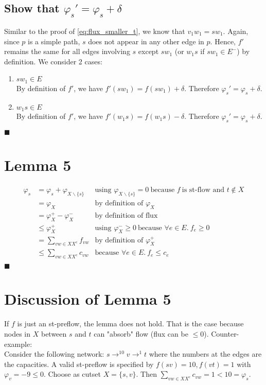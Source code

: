 \documentclass[10pt,a4paper]{article}
\begin{document}
	\subsection*{Show that $\varphi_s' = \varphi_s + \delta$}
	Similar to the proof of \ref{eq:flux_smaller_t}, we know that $v_1w_1 = sw_1$. Again, since $p$ is a simple path, $s$ does not appear in any other edge in $p$. Hence, $f'$ remains the same for all edges involving $s$ except $sw_1$ (or $w_1s$ if $sw_1 \in E^-$) by definition. We consider 2 cases:
	\begin{enumerate}
		\item $sw_1 \in E$ \\
		By definition of $f'$, we have $f'(sw_1) = f(sw_1) + \delta$. Therefore $\varphi_s' = \varphi_s + \delta$.
		\item $w_1s \in E$ \\
		By definition of $f'$, we have $f'(w_1s) = f(w_1s) - \delta$. Therefore $\varphi_s' = \varphi_s + \delta$.
	\end{enumerate} \hfill $\blacksquare$
	
	\section{Lemma 5}
	\begin{align*}
	\varphi_s &= \varphi_s + \varphi_{X\backslash\{s\}} &\text{using }\varphi_{X\backslash\{s\}} = 0~ \text{because }f~\text{is st-flow and }t \notin X\\
	&= \varphi_X & \text{by definition of }\varphi_X\\
	&= \varphi_X^+ - \varphi_X^- & \text{by definition of flux} \\
	&\leq \varphi_X^+ &\text{using }\varphi_X^- \geq 0~\text{because }\forall e\in E.\: f_e \geq 0 \\
	&= \sum_{vw \in XX^c} f_{vw} &\text{by definition of }\varphi_X^+ \\
	&\leq \sum_{vw \in XX^c} c_{vw} &\text{because }\forall e \in
                                          E. \: f_e \leq c_e \\
	\end{align*} \hfill $\blacksquare$
	
	\section{Discussion of Lemma 5}
	If $f$ is just an st-preflow, the lemma does not hold. 
	That is the case because nodes in $X$ between $s$ and $t$ can "absorb" flow (flux can be $\leq 0$). Counter-example: \\
	Consider the following network: $s \rightarrow^{10} v \rightarrow^{1} t$ where the numbers at the edges are the capacities.
	A valid st-preflow is specified by $f(sv) = 10, f(vt) = 1$ with $\varphi_v = -9 \leq 0$.
	Choose as cutset $X = \{s,v\}$. Then $\sum_{vw \in XX^c} c_{vw} = 1 < 10 = \varphi_s$.
\end{document}
